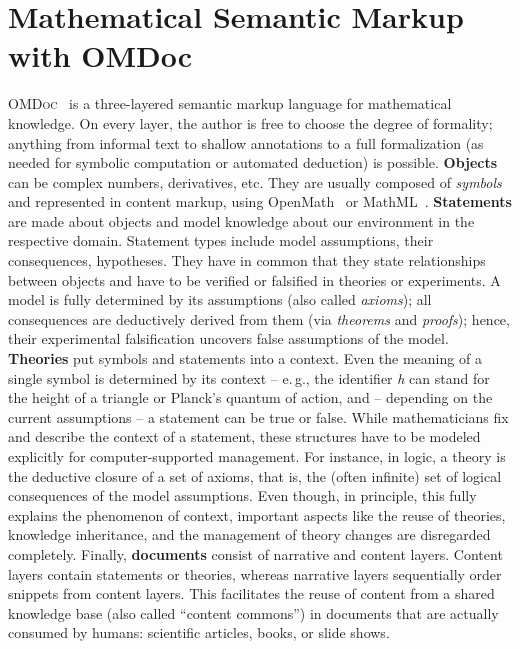\documentclass{llncs}
\renewcommand{\omdoc}{\textsc{OMDoc}\xspace}
\begin{document}
\section{Mathematical Semantic Markup with OMDoc}\label{sec:omdoc}


\omdoc~\cite{Kohlhase:omdoc1.2} is a three-layered semantic markup language for
mathematical knowledge.  On every layer, the author is free to choose the degree of
formality; anything from informal text to shallow annotations to a full formalization (as
needed for symbolic computation or automated deduction) is possible.  \textbf{Objects} can
be complex numbers, derivatives, etc.  They are usually composed of \emph{symbols} and
represented in content markup, using OpenMath~\cite{BusCapCar:2oms04} or
MathML~\cite{MathML3:webpage}.  \textbf{Statements} are made about objects and model
knowledge about our environment in the respective domain.  Statement types include model
assumptions, their consequences, hypotheses.  They have in common that they state
relationships between objects and have to be verified or falsified in theories or
experiments.  A model is fully determined by its assumptions (also called \emph{axioms});
all consequences are deductively derived from them (via \emph{theorems} and
\emph{proofs}); hence, their experimental falsification uncovers false assumptions of the
model. \textbf{Theories} put symbols and statements into a context.  Even the meaning of a
single symbol is determined by its context -- e.\,g., the identifier \emph{h} can stand
for the height of a triangle or Planck's quantum of action, and -- depending on the
current assumptions -- a statement can be true or false.  While mathematicians fix and
describe the context of a statement, these structures have to be modeled explicitly for
computer-supported management.  For instance, in logic, a theory is the deductive closure
of a set of axioms, that is, the (often infinite) set of logical consequences of the model
assumptions.  Even though, in principle, this fully explains the phenomenon of context,
important aspects like the reuse of theories, knowledge inheritance, and the management of
theory changes are disregarded completely.  Finally, \textbf{documents} consist of
narrative and content layers.  Content layers contain statements or theories, whereas
narrative layers sequentially order snippets from content layers.  This facilitates the
reuse of content from a shared knowledge base (also called ``content commons'') in
documents that are actually consumed by humans: scientific articles, books, or slide
shows.
\end{document}
